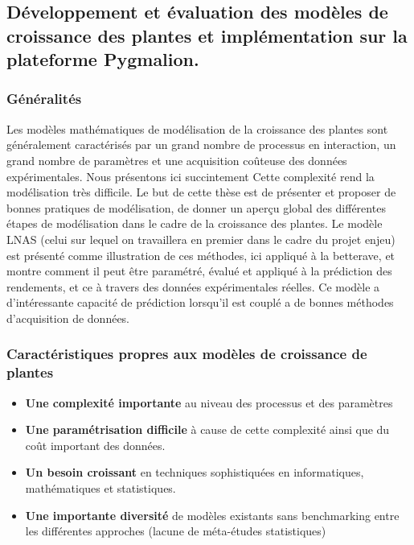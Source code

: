 \subsection{Développement et évaluation des modèles de croissance des plantes et implémentation sur la plateforme Pygmalion.}

\subsubsection{Généralités}

Les modèles mathématiques de modélisation de la croissance des plantes sont généralement caractérisés par un grand nombre de processus en interaction,  un grand nombre de paramètres et une acquisition coûteuse des données expérimentales. 
Nous présentons ici succintement Cette complexité rend la modélisation très difficile. Le but de cette thèse est de présenter et proposer de bonnes pratiques de modélisation, de donner un aperçu global des différentes étapes de modélisation dans le cadre de la croissance des plantes.
Le modèle LNAS (celui sur lequel on travaillera en premier dans le cadre du projet enjeu) est présenté comme illustration de ces méthodes, ici appliqué à la betterave, et montre comment il peut être paramétré, évalué et appliqué à la prédiction des rendements, et ce à travers des données expérimentales réelles. Ce modèle a d’intéressante capacité de prédiction lorsqu’il est couplé a de bonnes méthodes d’acquisition de données.

\subsubsection{Caractéristiques propres aux modèles de croissance de plantes}

\begin{itemize}

\item \textbf{Une complexité importante} au niveau des processus et des paramètres
\item \textbf{Une paramétrisation difficile} à cause de cette complexité ainsi que du coût important des données.
\item \textbf{Un besoin croissant} en techniques sophistiquées en informatiques, mathématiques et statistiques.
\item \textbf{Une importante diversité} de modèles existants sans benchmarking entre les différentes approches (lacune de méta-études statistiques)

\end{itemize}

